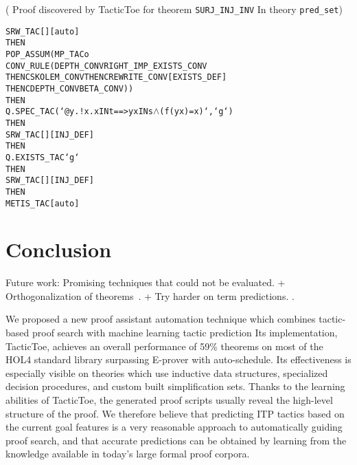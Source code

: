 \documentclass[runningheads,a4paper,draft]{svjour3}
\def\holfour{\textsf{HOL4}\xspace}
\def\hollight{\textsf{HOL Light}\xspace}
\def\eprover{\textsf{E-prover}\xspace}
\def\tactictoe{\textsf{TacticToe}\xspace}
\begin{document}
\newcommand{\wed}{\begin{math}\wedge\end{math}}

\begin{example}\label{ex:casestudy}(
Proof discovered by \tactictoe for theorem \texttt{SURJ\_INJ\_INV} In 
theory \texttt{pred\_set})
\small
\begin{center}
\begin{alltt}
    SRW_TAC [] [auto] 
  THEN 
    POP_ASSUM (MP_TAC o 
      CONV_RULE (DEPTH_CONV RIGHT_IMP_EXISTS_CONV 
                 THENC SKOLEM_CONV THENC REWRITE_CONV [EXISTS_DEF] 
                 THENC DEPTH_CONV BETA_CONV)) 
  THEN
    Q.SPEC_TAC (`@y. !x. x IN t ==> y x IN s \wed (f (y x) = x)`,`g`) 
  THEN
    SRW_TAC [] [INJ_DEF] 
  THEN
    Q.EXISTS_TAC `g` 
  THEN
    SRW_TAC [] [INJ_DEF] 
  THEN
    METIS_TAC [auto]

\end{alltt} 
\end{center}
\end{example}







\section{Conclusion}\label{sec:concl}

Future work:
  Promising techniques that could not be evaluated. 
  + Orthogonalization of theorems~\cite{ckju-jsc15}. 
  + Try harder on term predictions. \cite{latest version of sepia}.


We proposed a new proof assistant automation technique which combines 
tactic-based proof search with machine learning tactic prediction
Its implementation,
\tactictoe, achieves an overall performance of 59\% theorems on most of the 
\holfour standard library surpassing \eprover with auto-schedule. Its 
effectiveness is especially visible on 
theories which use inductive data structures, specialized decision procedures, 
and custom built simplification sets.
Thanks to the learning abilities of \tactictoe, the generated proof scripts 
usually reveal the high-level structure of the proof. %
We therefore believe that predicting ITP tactics based on the current goal 
features is a very reasonable approach to automatically guiding proof search, 
and that accurate predictions can be obtained by learning from the knowledge 
available in today's large formal proof corpora. 
\end{document}
